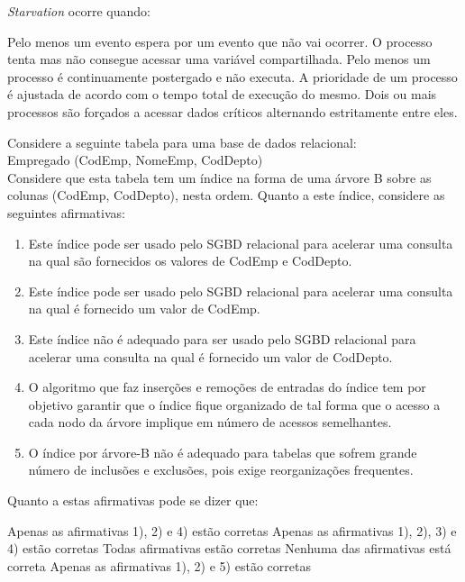 \documentclass[12pt, addpoints]{exam}
\begin{document}
    \begin{questions}

    \newpage
    \question
\textit{Starvation} ocorre quando:
\begin{choices}
\choice Pelo menos um evento espera por um evento que não vai ocorrer.
\choice O processo tenta mas não consegue acessar uma variável compartilhada.
\choice Pelo menos um processo é continuamente postergado e não executa.
\choice A prioridade de um processo é ajustada de acordo com o tempo total de execução do mesmo.
\choice Dois ou mais processos são forçados a acessar dados críticos alternando estritamente entre eles.
\end{choices}

\question
Considere a seguinte tabela para uma base de dados relacional:\\
Empregado (CodEmp, NomeEmp, CodDepto)\\
Considere que esta tabela tem um índice na forma de uma árvore B sobre as colunas (CodEmp, CodDepto), nesta ordem.
Quanto a este índice, considere as seguintes afirmativas:
\begin{enumerate}
    \item Este índice pode ser usado pelo SGBD relacional para acelerar uma consulta na qual são fornecidos os valores de CodEmp e CodDepto.
    \item Este índice pode ser usado pelo SGBD relacional para acelerar uma consulta na qual é fornecido um valor de CodEmp.
    \item Este índice não é adequado para ser usado pelo SGBD relacional para acelerar uma consulta na qual é fornecido um valor de CodDepto.
    \item O algoritmo que faz inserções e remoções de entradas do índice tem por objetivo garantir que o índice fique organizado de tal forma que o acesso a cada nodo da árvore implique em número de acessos semelhantes.
    \item O índice por árvore-B não é adequado para tabelas que sofrem grande número de inclusões e exclusões, pois exige reorganizações frequentes.
\end{enumerate}


Quanto a estas afirmativas pode se dizer que:
\begin{choices}
\choice Apenas as afirmativas 1), 2) e 4) estão corretas
\choice Apenas as afirmativas 1), 2), 3) e 4) estão corretas
\choice Todas afirmativas estão corretas
\choice Nenhuma das afirmativas está correta
\choice Apenas as afirmativas 1), 2) e 5) estão corretas
\end{choices}


\end{questions}
\end{document}
